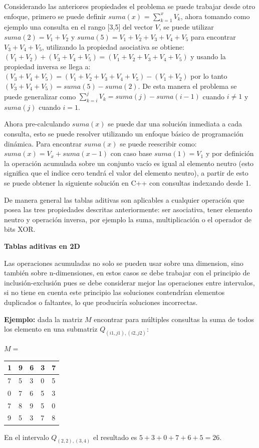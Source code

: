\documentclass[12pt, a4paper]{article}
\newcommand\cppfile[2][]{

}
\newcommand{\subtitulo}[1]{\begin{center}\textbf{#1}\end{center}}
\begin{document}
	Considerando las anteriores propiedades el problema se puede trabajar desde otro enfoque, primero se puede
	definir $suma(x)$ = $\sum_{k=1}^{x} V_{k}$, ahora tomando como ejemplo una consulta en el rango [3,5] 
	del vector $V$, se puede utilizar $suma(2) = V_{1}+V_{2}$ y $suma(5) = V_{1}+V_{2}+V_{3}+V_{4}+V_{5}$ para
	encontrar $V_{3}+V_{4}+V_{5}$, utilizando la propiedad asociativa se obtiene: 
	$(V_{1}+V_{2})+(V_{3}+V_{4}+V_{5})=(V_{1}+V_{2}+V_{3}+V_{4}+V_{5})$ y usando la propiedad inversa se llega a:
	$(V_{3}+V_{4}+V_{5})=(V_{1}+V_{2}+V_{3}+V_{4}+V_{5})-(V_{1}+V_{2})$ por lo tanto 
	$(V_{3}+V_{4}+V_{5})=suma(5)-suma(2)$. De esta manera el problema se puede generalizar como 
	$\sum_{k=i}^{j} V_{k} = suma(j) - suma(i-1)$ cuando $i \neq 1$ y $suma(j)$ cuando $i=1$.
	
	Ahora pre-calculando $suma(x)$ se puede dar una solución inmediata a cada consulta, esto se puede resolver 
	utilizando un enfoque básico de programación dinámica. Para encontrar $suma(x)$ se puede reescribir como: 
	$suma(x) = V_{x} + suma(x-1)$ con caso base $suma(1)=V_{1}$ y por definición la operación acumulada sobre un 
	conjunto vacío es igual al elemento neutro (esto significa que el indice cero tendrá el valor del elemento 
	neutro), a partir de esto se puede obtener la siguiente solución en C++ con consultas indexando desde 1.
	\cppfile[6-14]{Estructuras_de_datos/codigos/tablas_aditivas.cpp}
	
	De manera general las tablas aditivas son aplicables a cualquier operación que posea las tres propiedades 
	descritas anteriormente: ser asociativa, tener elemento neutro y operación inversa, por ejemplo la suma,
	multiplicación o el operador de bits XOR.

	\subtitulo{Tablas aditivas en 2D}
	
	Las operaciones acumuladas no solo se pueden usar sobre una dimension, sino también sobre n-dimensiones, en estos
	casos se debe trabajar con el principio de inclusión-exclusión pues se debe considerar mejor las operaciones entre
	intervalos, si no tiene en cuenta este principio las soluciones contendrían elementos duplicados o faltantes, lo 
	que produciría soluciones incorrectas.
	
	\textbf{Ejemplo:} dada la matriz $M$ encontrar para múltiples consultas la suma de todos los elemento en una
	submatriz $Q_{(i1,j1),(i2,j2)}$:
	\begin{center}
		$M = $
		\begin{tabular}{|l|l|l|l|l|}
			\hline
			1  &9  &6 &3 &7\\ \hline
			7  &5  &3 &0 &5\\ \hline
			0  &7  &6 &5 &3\\ \hline
			7  &8  &9 &5 &0\\ \hline
			9  &5  &3 &7 &8\\ \hline
		\end{tabular}
	\end{center}
	En el intervalo $Q_{(2,2),(3,4)}$ el resultado es $5+3+0+7+6+5=26$.
\end{document}
